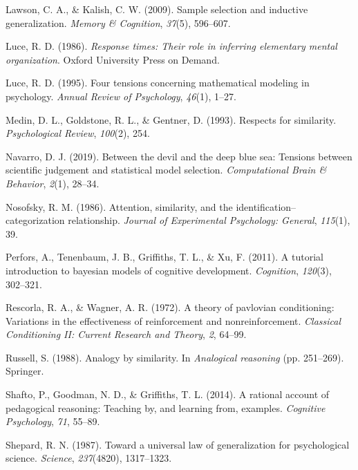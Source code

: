 \documentclass[
  english,
  doc]{apa6}
\begin{document}
\leavevmode\hypertarget{ref-lawson2009sample}{}%
Lawson, C. A., \& Kalish, C. W. (2009). Sample selection and inductive generalization. \emph{Memory \& Cognition}, \emph{37}(5), 596--607.

\leavevmode\hypertarget{ref-luce1986response}{}%
Luce, R. D. (1986). \emph{Response times: Their role in inferring elementary mental organization}. Oxford University Press on Demand.

\leavevmode\hypertarget{ref-luce1995four}{}%
Luce, R. D. (1995). Four tensions concerning mathematical modeling in psychology. \emph{Annual Review of Psychology}, \emph{46}(1), 1--27.

\leavevmode\hypertarget{ref-medin1993respects}{}%
Medin, D. L., Goldstone, R. L., \& Gentner, D. (1993). Respects for similarity. \emph{Psychological Review}, \emph{100}(2), 254.

\leavevmode\hypertarget{ref-navarro2019between}{}%
Navarro, D. J. (2019). Between the devil and the deep blue sea: Tensions between scientific judgement and statistical model selection. \emph{Computational Brain \& Behavior}, \emph{2}(1), 28--34.

\leavevmode\hypertarget{ref-nosofsky1986attention}{}%
Nosofsky, R. M. (1986). Attention, similarity, and the identification--categorization relationship. \emph{Journal of Experimental Psychology: General}, \emph{115}(1), 39.

\leavevmode\hypertarget{ref-perfors2011tutorial}{}%
Perfors, A., Tenenbaum, J. B., Griffiths, T. L., \& Xu, F. (2011). A tutorial introduction to bayesian models of cognitive development. \emph{Cognition}, \emph{120}(3), 302--321.

\leavevmode\hypertarget{ref-rescorla1972theory}{}%
Rescorla, R. A., \& Wagner, A. R. (1972). A theory of pavlovian conditioning: Variations in the effectiveness of reinforcement and nonreinforcement. \emph{Classical Conditioning II: Current Research and Theory}, \emph{2}, 64--99.

\leavevmode\hypertarget{ref-russell1988analogy}{}%
Russell, S. (1988). Analogy by similarity. In \emph{Analogical reasoning} (pp. 251--269). Springer.

\leavevmode\hypertarget{ref-shafto2014rational}{}%
Shafto, P., Goodman, N. D., \& Griffiths, T. L. (2014). A rational account of pedagogical reasoning: Teaching by, and learning from, examples. \emph{Cognitive Psychology}, \emph{71}, 55--89.

\leavevmode\hypertarget{ref-shepard1987toward}{}%
Shepard, R. N. (1987). Toward a universal law of generalization for psychological science. \emph{Science}, \emph{237}(4820), 1317--1323.
\end{document}
